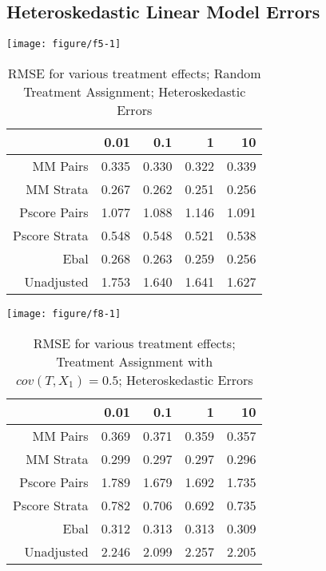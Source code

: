 \documentclass[11pt]{article}\usepackage[]{graphicx}\usepackage[]{color}
\makeatletter
\def\maxwidth{ %
  \ifdim\Gin@nat@width>\linewidth
    \linewidth
  \else
    \Gin@nat@width
  \fi
}
\newenvironment{knitrout}{}{} %
\makeatother
\begin{document}
\subsection{Heteroskedastic Linear Model Errors}
\begin{knitrout}
\color{fgcolor}

{\centering \texttt{[image: figure/f5-1]} 

}



\end{knitrout}
\begin{table}[ht]
\centering
\begin{tabular}{rrrrr}
  \hline
 & 0.01 & 0.1 & 1 & 10 \\ 
  \hline
MM Pairs & 0.335 & 0.330 & 0.322 & 0.339 \\ 
  MM Strata & 0.267 & 0.262 & 0.251 & 0.256 \\ 
  Pscore Pairs & 1.077 & 1.088 & 1.146 & 1.091 \\ 
  Pscore Strata & 0.548 & 0.548 & 0.521 & 0.538 \\ 
  Ebal & 0.268 & 0.263 & 0.259 & 0.256 \\ 
  Unadjusted & 1.753 & 1.640 & 1.641 & 1.627 \\ 
   \hline
\end{tabular}
\caption{RMSE for various treatment effects; Random Treatment Assignment; Heteroskedastic Errors} 
\label{tab:f5}
\end{table}


\begin{knitrout}
\color{fgcolor}

{\centering \texttt{[image: figure/f8-1]} 

}



\end{knitrout}
\begin{table}[ht]
\centering
\begin{tabular}{rrrrr}
  \hline
 & 0.01 & 0.1 & 1 & 10 \\ 
  \hline
MM Pairs & 0.369 & 0.371 & 0.359 & 0.357 \\ 
  MM Strata & 0.299 & 0.297 & 0.297 & 0.296 \\ 
  Pscore Pairs & 1.789 & 1.679 & 1.692 & 1.735 \\ 
  Pscore Strata & 0.782 & 0.706 & 0.692 & 0.735 \\ 
  Ebal & 0.312 & 0.313 & 0.313 & 0.309 \\ 
  Unadjusted & 2.246 & 2.099 & 2.257 & 2.205 \\ 
   \hline
\end{tabular}
\caption{RMSE for various treatment effects; Treatment Assignment with $cov(T, X_1) = 0.5$; Heteroskedastic Errors} 
\label{tab:f8}
\end{table}
\end{document}
